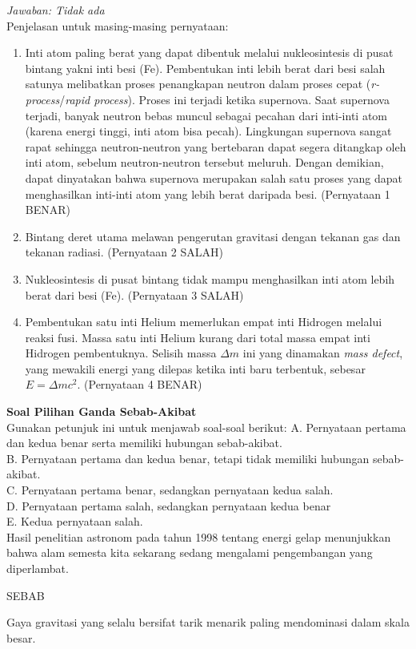 \documentclass[11pt,fleqn, a4paper]{exam}
\begin{document}
\begin{questions}
\textit{Jawaban: Tidak ada}\\
Penjelasan untuk masing-masing pernyataan:
\begin{enumerate}
\item Inti atom paling berat yang dapat dibentuk melalui nukleosintesis di pusat bintang yakni inti besi (Fe). Pembentukan inti lebih berat dari besi salah satunya melibatkan proses penangkapan neutron dalam proses cepat (\textit{r-process}/\textit{rapid process}). Proses ini terjadi ketika supernova. Saat supernova terjadi, banyak neutron bebas muncul sebagai pecahan dari inti-inti atom (karena energi tinggi, inti atom bisa pecah). Lingkungan supernova sangat rapat sehingga neutron-neutron yang bertebaran dapat segera ditangkap oleh inti atom, sebelum neutron-neutron tersebut meluruh. Dengan demikian, dapat dinyatakan bahwa supernova merupakan salah satu proses yang dapat menghasilkan inti-inti atom yang lebih berat daripada besi. (Pernyataan 1 BENAR)
\item Bintang deret utama melawan pengerutan gravitasi dengan tekanan gas dan tekanan radiasi. (Pernyataan 2 SALAH)
\item Nukleosintesis di pusat bintang tidak mampu menghasilkan inti atom lebih berat dari besi (Fe). (Pernyataan 3 SALAH)
\item Pembentukan satu inti Helium memerlukan empat inti Hidrogen melalui reaksi fusi. Massa satu inti Helium kurang dari total massa empat inti Hidrogen pembentuknya. Selisih massa $\Delta m$ ini yang dinamakan \textit{mass defect}, yang mewakili energi yang dilepas ketika inti baru terbentuk, sebesar $E=\Delta m c^2$. (Pernyataan 4 BENAR)
\end{enumerate}

\vspace{1cm}
\textbf{Soal Pilihan Ganda Sebab-Akibat}\\
Gunakan petunjuk ini untuk menjawab soal-soal berikut:
A. Pernyataan pertama dan kedua benar serta memiliki hubungan sebab-akibat.\\
B. Pernyataan pertama dan kedua benar, tetapi tidak memiliki hubungan sebab-akibat.\\
C. Pernyataan pertama benar, sedangkan pernyataan kedua salah.\\
D. Pernyataan pertama salah, sedangkan pernyataan kedua benar\\
E. Kedua pernyataan salah.\\

\question Hasil penelitian astronom pada tahun 1998 tentang energi gelap menunjukkan bahwa alam semesta kita sekarang sedang mengalami pengembangan yang diperlambat.
\begin{center}
SEBAB
\end{center}
\noindent Gaya gravitasi yang selalu bersifat tarik menarik paling mendominasi dalam skala besar.


\end{questions}
\end{document}
